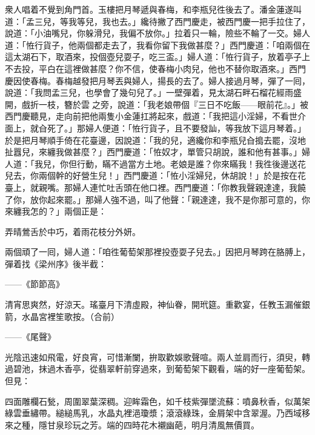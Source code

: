 衆人唱着不覺到角門首。玉樓把月琴遞與春梅，和李瓶兒徃後去了。{}潘金蓮遂叫道：「孟三兒，等我等兒，我也去。」纔待撇了西門慶走，被西門慶一把手拉住了，說道：「小油嘴兒，你躲滑兒，我偏不放你。」拉着只一輪，險些不輪了一交。{}婦人道：「恠行貨子，他兩個都走去了，我看你留下我做甚麼？」西門慶道：「咱兩個在這太湖石下，取酒來，投個壺兒耍子，吃三盃。」婦人道：「恠行貨子，放着亭子上不去投，平白在這裡做甚麼？你不信，使春梅小肉兒，他也不替你取酒來。」西門慶因使春梅。春梅越發把月琴丟與婦人，揚長的去了。{}婦人接過月琴，彈了一囘，說道：「我問孟三兒，也學會了幾句兒了。」一壁彈着，見太湖石畔石榴花經雨盛開，戲折一枝，簪於雲𩬆之旁，{}說道：「我老娘帶個『三日不吃飯——眼前花』。」{}被西門慶聽見，走向前把他兩隻小金蓮扛將起來，戲道：「我把這小淫婦，不看世介面上，就㒲死了。」{}那婦人便道：「恠行貨子，且不要發訕，等我放下這月琴着。」{}於是把月琴順手倚在花臺邊，因說道：「我的兒，適纔你和李瓶兒㒲搗去罷，沒地扯囂兒，來纏我做甚麼？」西門慶道：「恠奴才，單管只胡說，誰和他有甚事。」婦人道：「我兒，你但行動，瞞不過當方土地。老娘是誰？你來瞞我！我徃後邊送花兒去，你兩個幹的好營生兒！」西門慶道：「恠小淫婦兒，休胡說！」於是按在花臺上，就親嘴。那婦人連忙吐舌頭在他口裡。西門慶道：「你教我聲親達達，我饒了你，放你起來罷。」那婦人強不過，叫了他聲：「親達達，我不是你那可意的，你來纏我怎的？」{}兩個正是：

弄晴鶯舌於中巧，着雨花枝分外妍。

兩個頑了一囘，婦人道：「咱徃葡萄架那裡投壺耍子兒去。」因把月琴跨在胳膊上，{}彈着找《梁州序》後半截：{}

——《節節高》

清宵思爽然，好涼天。瑤臺月下清虛殿，神仙眷，開玳筵。重歡宴，任教玉漏催銀箭，水晶宮裡笙歌按。（合前）

——《尾聲》

光陰迅速如飛電，好良宵，可惜漸闌，拚取歡娛歌聲喧。兩人並肩而行，須臾，轉過碧池，抹過木香亭，從翡翠軒前穿過來，到葡萄架下觀看，端的好一座葡萄架。但見：

四面雕欄石甃，周圍翠葉深稠。迎眸霜色，如千枝紫彈墜流蘇：噴鼻秋香，似萬架綠雲垂繡帶。縋縋馬乳，水晶丸裡浥瓊漿；滾滾綠珠，金屑架中含翠渥。乃西域移來之種，隱甘泉珍玩之芳。端的四時花木襯幽葩，明月清風無價買。

